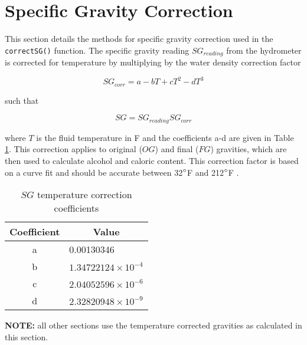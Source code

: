 \documentclass[../main.tex]{subfiles}
\begin{document}
\section{Specific Gravity Correction}
    This section details the methods for specific gravity correction used in the \texttt{correctSG()} function. The specific gravity reading $SG_{reading}$ from the hydrometer is corrected for temperature by multiplying by the water density correction factor
    
    \begin{equation}
        SG_{corr} = a - b T + c T^{2} - d T^{3}
    \end{equation}
    
    such that
    
    \begin{equation}
        SG = SG_{reading} SG_{corr}
    \end{equation}
    
    where $T$ is the fluid temperature in \tdeg F and the coefficients a-d are given in Table \ref{tab:sgcorr}. This correction applies to original ($OG$) and final ($FG$) gravities, which are then used to calculate alcohol and caloric content. This correction factor is based on a curve fit and should  be accurate between 32${}^{\circ}$F and 212${}^{\circ}$F \cite{hall_1995}.
    
    \begin{table}[H]
        \centering
        \caption{$SG$ temperature correction coefficients}
        \begin{tabular}{cl}
             Coefficient & \multicolumn{1}{c}{Value} \\
             \hline
             a & 0.00130346 \\
             b & $1.34722124 \times 10^{-4}$ \\
             c & $2.04052596 \times 10^{-6}$ \\
             d & $2.32820948 \times 10^{-9}$
        \end{tabular}
        \label{tab:sgcorr}
    \end{table}

    \textbf{NOTE:} all other sections use the temperature corrected gravities as calculated in this section.
    
\end{document}
